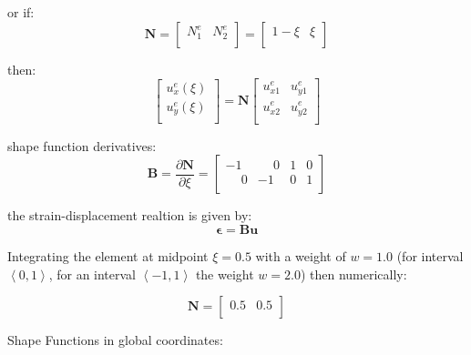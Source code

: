 \documentclass[10pt,b5paper,titlepage]{book}
\newcommand{\m}{\mathbf}
\newcommand{\M}{\pmb}
\begin{document}
or if:
\begin{equation}
    \m{N} = \begin{bmatrix}
        N_1^e & N_2^e \\
    \end{bmatrix}
    = \begin{bmatrix}
        1 - \xi & \xi \\
    \end{bmatrix}
\end{equation}

then:
\begin{equation}
    \begin{bmatrix}
        u_x^e(\xi) \\
        u_y^e(\xi) \\
    \end{bmatrix}
    = \m{N} \begin{bmatrix}
        u_{x1}^e & u_{y1}^e \\
        u_{x2}^e & u_{y2}^e \\
    \end{bmatrix}
\end{equation}

shape function derivatives:
\begin{equation}
    \m{B} = \frac{\partial \m{N}}{\partial \xi} =
    \begin{bmatrix}
        -1 & \phantom{-}0 & 1 & 0 \\
        \phantom{-}0 & -1 & 0 & 1  \\
    \end{bmatrix}
\end{equation}

the strain-displacement realtion is given by:
\begin{equation}
    \M{\epsilon} = \m{B} \m{u}
\end{equation}

Integrating the element at midpoint $ \xi = 0.5 $ with a weight of $ w = 1.0 $
(for interval $ \left< 0, 1 \right> $, for an interval
$ \left< -1,  1 \right> $ the weight $ w = 2.0 $)
then numerically:

\begin{equation}
    \m{N} = \begin{bmatrix}
        0.5 & 0.5 \\
    \end{bmatrix}
\end{equation}

Shape Functions in global coordinates:
\end{document}
